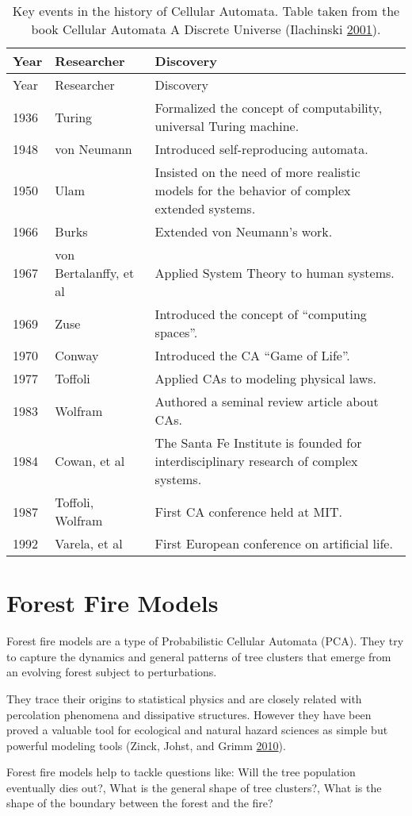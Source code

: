 \documentclass[
]{book}
\begin{document}
\begin{longtable}[]{@{}lll@{}}
\caption{Key events in the history of Cellular Automata. Table taken from the book Cellular Automata A Discrete Universe (Ilachinski \protect\hyperlink{ref-ilachinski2001cellular}{2001}).}\tabularnewline
\toprule
Year & Researcher & Discovery\tabularnewline
\midrule
\endfirsthead
\toprule
Year & Researcher & Discovery\tabularnewline
\midrule
\endhead
1936 & Turing & Formalized the concept of computability, universal Turing machine.\tabularnewline
1948 & von Neumann & Introduced self-reproducing automata.\tabularnewline
1950 & Ulam & Insisted on the need of more realistic models for the behavior of complex extended systems.\tabularnewline
1966 & Burks & Extended von Neumann's work.\tabularnewline
1967 & von Bertalanffy, et al & Applied System Theory to human systems.\tabularnewline
1969 & Zuse & Introduced the concept of ``computing spaces''.\tabularnewline
1970 & Conway & Introduced the CA ``Game of Life''.\tabularnewline
1977 & Toffoli & Applied CAs to modeling physical laws.\tabularnewline
1983 & Wolfram & Authored a seminal review article about CAs.\tabularnewline
1984 & Cowan, et al & The Santa Fe Institute is founded for interdisciplinary research of complex systems.\tabularnewline
1987 & Toffoli, Wolfram & First CA conference held at MIT.\tabularnewline
1992 & Varela, et al & First European conference on artificial life.\tabularnewline
\bottomrule
\end{longtable}

\hypertarget{forest-fire-models}{%
\section{Forest Fire Models}\label{forest-fire-models}}

Forest fire models are a type of Probabilistic Cellular Automata (PCA). They try to capture the dynamics and general patterns of tree clusters that emerge from an evolving forest subject to perturbations.

They trace their origins to statistical physics and are closely related with percolation phenomena and dissipative structures. However they have been proved a valuable tool for ecological and natural hazard sciences as simple but powerful modeling tools (Zinck, Johst, and Grimm \protect\hyperlink{ref-zinck2010wildfire}{2010}).

Forest fire models help to tackle questions like: Will the tree population eventually dies out?, What is the general shape of tree clusters?, What is the shape of the boundary between the forest and the fire?
\end{document}
